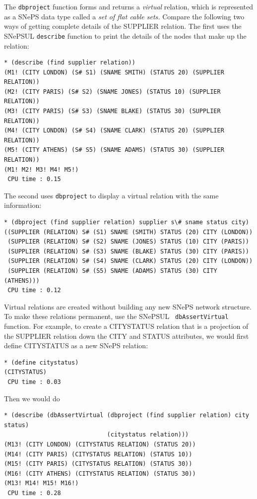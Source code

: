 \documentclass{book}
\begin{document}
The {\tt dbproject} function forms and returns a {\em virtual}
relation, which is represented as a SNePS data type called a {\em set
of flat cable sets.}  Compare the following two ways of getting
complete details of the SUPPLIER relation.  The first uses the SNePSUL
{\tt describe} function to print the details of the nodes that make up
the relation:
\begin{verbatim}
* (describe (find supplier relation))
(M1! (CITY LONDON) (S# S1) (SNAME SMITH) (STATUS 20) (SUPPLIER RELATION))
(M2! (CITY PARIS) (S# S2) (SNAME JONES) (STATUS 10) (SUPPLIER RELATION))
(M3! (CITY PARIS) (S# S3) (SNAME BLAKE) (STATUS 30) (SUPPLIER RELATION))
(M4! (CITY LONDON) (S# S4) (SNAME CLARK) (STATUS 20) (SUPPLIER RELATION))
(M5! (CITY ATHENS) (S# S5) (SNAME ADAMS) (STATUS 30) (SUPPLIER RELATION))
(M1! M2! M3! M4! M5!)
 CPU time : 0.15 
\end{verbatim}
The second uses {\tt dbproject} to display a virtual relation with the
same information:
\begin{verbatim}
* (dbproject (find supplier relation) supplier s\# sname status city)
((SUPPLIER (RELATION) S# (S1) SNAME (SMITH) STATUS (20) CITY (LONDON))
 (SUPPLIER (RELATION) S# (S2) SNAME (JONES) STATUS (10) CITY (PARIS))
 (SUPPLIER (RELATION) S# (S3) SNAME (BLAKE) STATUS (30) CITY (PARIS))
 (SUPPLIER (RELATION) S# (S4) SNAME (CLARK) STATUS (20) CITY (LONDON))
 (SUPPLIER (RELATION) S# (S5) SNAME (ADAMS) STATUS (30) CITY (ATHENS)))
 CPU time : 0.12 
\end{verbatim}

Virtual relations are created without building any new SNePS network
structure.  To make these relations permanent, use the SNePSUL {\tt
dbAssertVirtual} function.  For example, to create a CITYSTATUS
relation that is a projection of the SUPPLIER relation down the CITY
and STATUS attributes, we would first define CITYSTATUS as a new SNePS
relation:
\begin{verbatim}
* (define citystatus)
(CITYSTATUS)
 CPU time : 0.03 
\end{verbatim}
Then we would do
\begin{verbatim}
* (describe (dbAssertVirtual (dbproject (find supplier relation) city status) 
                             (citystatus relation)))
(M13! (CITY LONDON) (CITYSTATUS RELATION) (STATUS 20))
(M14! (CITY PARIS) (CITYSTATUS RELATION) (STATUS 10))
(M15! (CITY PARIS) (CITYSTATUS RELATION) (STATUS 30))
(M16! (CITY ATHENS) (CITYSTATUS RELATION) (STATUS 30))
(M13! M14! M15! M16!)
 CPU time : 0.28 
\end{verbatim}
\end{document}
